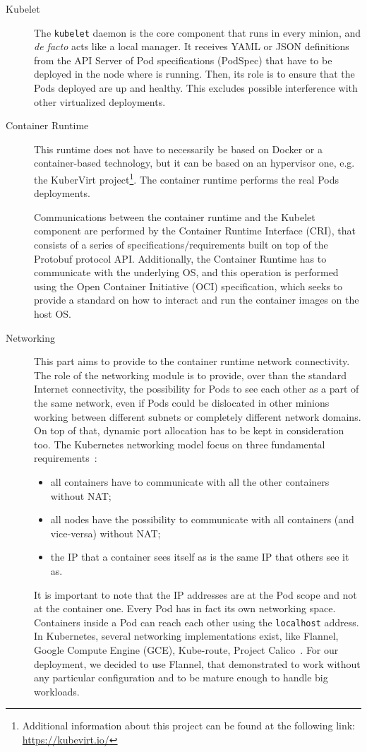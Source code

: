 \begin{description}
\item[Kubelet] The \verb!kubelet! daemon is the core component that runs in
  every minion, and \emph{de facto} acts like a local manager. It receives YAML
  or JSON definitions from the API Server of Pod specifications (PodSpec) that
  have to be deployed in the node where is running. Then, its role is to ensure
  that the Pods deployed are up and healthy. This excludes possible
  interference with other virtualized deployments.
\item[Container Runtime] This runtime does not have to necessarily be based on
  Docker or a container-based technology, but it can be based on an hypervisor
  one, e.g. the KuberVirt project\footnote{Additional information about this
    project can be found at the following link: \url{https://kubevirt.io/}}. The
  container runtime performs the real Pods deployments.

  Communications between the container runtime and the Kubelet component are
  performed by the Container Runtime Interface (CRI), that consists of a series
  of specifications/requirements built on top of the Protobuf protocol API.
  Additionally, the Container Runtime has to communicate with the underlying OS,
  and this operation is performed using the Open Container Initiative (OCI)
  specification, which seeks to provide a standard on how to interact and run
  the container images on the host OS.
\item[Networking] This part aims to provide to the container runtime network
  connectivity. The role of the networking module is to provide, over than the
  standard Internet connectivity, the possibility for Pods to see each other as
  a part of the same network, even if Pods could be dislocated in other minions
  working between different subnets or completely different network domains. On
  top of that, dynamic port allocation has to be kept in consideration too. The
  Kubernetes networking model focus on three fundamental
  requirements~\cite{k8snetworkingwiki}:
  \begin{itemize}
  \item all containers have to communicate with all the other containers without
    NAT;
  \item all nodes have the possibility to communicate with all containers (and
    vice-versa) without NAT;
  \item the IP that a container sees itself as is the same IP that others see it
    as.
  \end{itemize}
  It is important to note that the IP addresses are at the Pod scope and not at
  the container one. Every Pod has in fact its own networking space. Containers
  inside a Pod can reach each other using the \verb!localhost! address. In
  Kubernetes, several networking implementations exist, like Flannel, Google
  Compute Engine (GCE), Kube-route, Project Calico~\cite{k8snetworkingwiki}. For
  our deployment, we decided to use Flannel, that demonstrated to work without
  any particular configuration and to be mature enough to handle big workloads.


\end{description}
